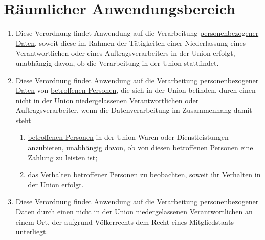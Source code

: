\chapter{Räumlicher Anwendungsbereich}
\label{ch:3}


\begin{enumerate}

  \item Diese Verordnung findet Anwendung auf die Verarbeitung \hyperref[itm:04-1]{personenbezogener Daten}, soweit
   diese im Rahmen der Tätigkeiten einer Niederlassung eines Verantwortlichen oder eines Auftragsverarbeiters in der
   Union erfolgt, unabhängig davon, ob die Verarbeitung in der Union stattfindet.
  \label{itm:03-1}

  \item Diese Verordnung findet Anwendung auf die Verarbeitung \hyperref[itm:04-1]{personenbezogener Daten} von
   \hyperref[itm:04-1]{betroffenen Personen}, die sich in der Union befinden, durch einen nicht in der Union niedergelassenen
   Verantwortlichen oder Auftragsverarbeiter, wenn die Datenverarbeitung im Zusammenhang damit steht
  \label{itm:03-2}

  \begin{enumerate}
  
    \item \hyperref[itm:04-1]{betroffenen Personen} in der Union Waren oder Dienstleistungen anzubieten, unabhängig davon, ob von diesen
     \hyperref[itm:04-1]{betroffenen Personen} eine Zahlung zu leisten ist;
    \label{itm:03-2a}

    \item das Verhalten \hyperref[itm:04-1]{betroffener Personen} zu beobachten, soweit ihr Verhalten in der Union erfolgt.
    \label{itm:03-2b}

  \end{enumerate}

  \item Diese Verordnung findet Anwendung auf die Verarbeitung \hyperref[itm:04-1]{personenbezogener Daten} durch einen
   nicht in der Union niedergelassenen Verantwortlichen an einem Ort, der aufgrund Völkerrechts dem Recht eines
   Mitgliedstaats unterliegt.
  \label{itm:03-3}

\end{enumerate}


